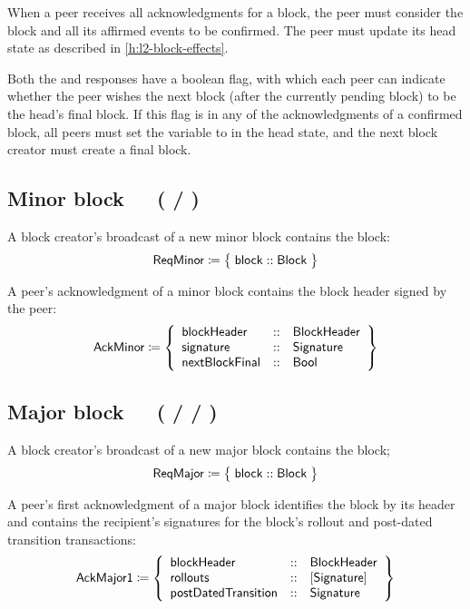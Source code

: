 \documentclass[../hydrozoa.tex]{subfiles}
\begin{document}
When a peer receives all acknowledgments for a block, the peer must consider the block and all its affirmed events to be confirmed.
The peer must update its head state as described in \cref{h:l2-block-effects}.

Both the  and  responses have a  boolean flag, with which each peer can indicate whether the peer wishes the next block (after the currently pending block) to be the head's final block.
If this flag is  in any of the acknowledgments of a confirmed block, all peers must set the  variable to  in the head state, and the next block creator must create a final block.

\subsection{Minor block~~~( / )}%
\label{h:l2-consensus-minor-block}%

A block creator's broadcast of a new minor block contains the block:
\begin{equation*}
  \mathsf{ReqMinor} \coloneq \;\bigr\{\; \mathsf{block} :: \mathsf{Block} \;\bigr\}
\end{equation*}

A peer's acknowledgment of a minor block contains the block header signed by the peer:
\begin{equation*}
  \mathsf{AckMinor} \coloneq \left\{
  \begin{array}{lll}
    \mathsf{blockHeader} &::& \mathsf{BlockHeader} \\
    \mathsf{signature} &::& \mathsf{Signature} \\
    \mathsf{nextBlockFinal} &::& \mathsf{Bool}
  \end{array}\right\}
\end{equation*}

\subsection{Major block~~~( /  / )}%
\label{h:l2-consensus-major-block}%

A block creator's broadcast of a new major block contains the block;
\begin{equation*}
  \mathsf{ReqMajor} \coloneq \;\bigr\{\; \mathsf{block} :: \mathsf{Block} \;\bigr\}
\end{equation*}

A peer's first acknowledgment of a major block identifies the block by its header and contains the recipient's signatures for the block's rollout and post-dated transition transactions:
\begin{equation*}
  \mathsf{AckMajor1} \coloneq \left\{
  \begin{array}{lll}
    \mathsf{blockHeader} &::& \mathsf{BlockHeader} \\
    \mathsf{rollouts} &::& [\mathsf{Signature}] \\
    \mathsf{postDatedTransition} &::& \mathsf{Signature}
  \end{array}\right\}
\end{equation*}
\end{document}
